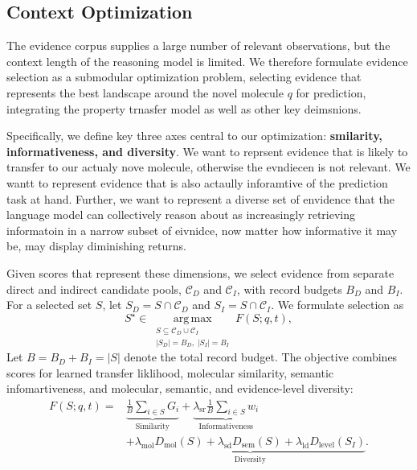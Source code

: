 \subsection{Context Optimization}
\label{sec:context-optimization}
The evidence corpus supplies a large number of relevant observations, but the context length of the reasoning model is limited. We therefore formulate evidence selection as a submodular optimization problem, selecting evidence that represents the best landscape around the novel molecule $q$ for prediction, integrating the property trnasfer model as well as other key deimsnions.

Specifically, we define key three axes central to our optimization: \textbf{smilarity, informativeness, and diversity}. We want to reprsent evidence that is likely to transfer to our actualy nove molecule, otherwise the evndiecen is not relevant. We wantt to represent evidence that is also actaully inforamtive of the prediction task at hand. Further, we want to represent a diverse set of envidence that the language model can collectively reason about as increasingly retrieving informatoin in a narrow subset of eivnidce, now matter how informative it may be, may display diminishing returns.

Given scores that represent these dimensions, we select evidence from separate direct and indirect candidate pools, $\mathcal{C}_D$ and $\mathcal{C}_I$, with record budgets $B_D$ and $B_I$. For a selected set $S$, let $S_D=S\cap\mathcal{C}_D$ and $S_I=S\cap\mathcal{C}_I$. We formulate selection as
\begin{equation}
    S^\star
    \in
    \operatorname*{arg\,max}_{\substack{
        S\subseteq\mathcal{C}_D\cup\mathcal{C}_I\\
        |S_D|=B_D,\;|S_I|=B_I
    }}
    F(S;q,t),
    \label{eq:context-selection}
\end{equation}
Let $B=B_D+B_I=|S|$ denote the total record budget. The objective combines scores for learned transfer liklihood, molecular similarity, semantic infomartiveness, and molecular, semantic, and evidence-level diversity:
\begin{equation}
\begin{aligned}
    F(S;q,t)
    ={}&\underbrace{\frac{1}{B}\sum_{i\in S}G_i}_{\text{Similarity}}
    +\underbrace{\lambda_{\mathrm{sr}}\frac{1}{B}
        \sum_{i\in S}w_i}_{\text{Informativeness}}\\
    &+\underbrace{\lambda_{\mathrm{mol}}D_{\mathrm{mol}}(S)
        +\lambda_{\mathrm{sd}}D_{\mathrm{sem}}(S)
        +\lambda_{\mathrm{ld}}D_{\mathrm{level}}(S_I)}_{\text{Diversity}}.
\end{aligned}
\label{eq:context-objective}
\end{equation}

